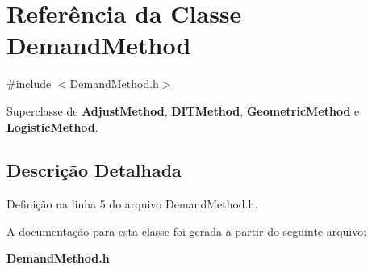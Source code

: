 \section{Referência da Classe Demand\+Method}
\label{class_demand_method}


{\ttfamily \#include $<$Demand\+Method.\+h$>$}



Superclasse de {\bf Adjust\+Method}, {\bf D\+I\+T\+Method}, {\bf Geometric\+Method} e {\bf Logistic\+Method}.



\subsection{Descrição Detalhada}


Definição na linha 5 do arquivo Demand\+Method.\+h.



A documentação para esta classe foi gerada a partir do seguinte arquivo\+:\begin{DoxyCompactItemize}
\item 
{\bf Demand\+Method.\+h}\end{DoxyCompactItemize}
